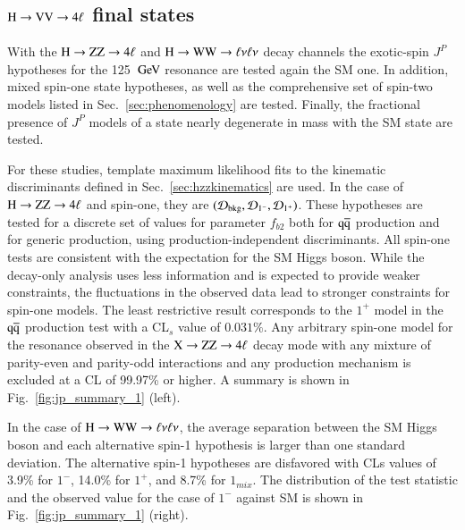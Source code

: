 \subsection{$\mathrm{H}\to\mathrm{V}\mathrm{V}\to4\ell$ final states}
\label{sec:exotic_h4l}

With the $\mathrm{H}\to\mathrm{Z}\mathrm{Z}\to4\ell$ and $\mathrm{H}\to\mathrm{W}\mathrm{W}\to\ell\nu\ell\nu$ decay channels the exotic-spin
$J^P$ hypotheses for the 125 $\,\mathrm{Ge\hspace{-.08em}V}$ resonance are tested again the SM
one. In addition, mixed spin-one state hypotheses, as well as the
comprehensive set of spin-two models listed in
Sec.~\ref{sec:phenomenology} are tested. Finally, the fractional
presence of $J^P$ models of a state nearly degenerate in mass with the
SM state are tested.

For these studies, template maximum likelihood fits to the kinematic
discriminants defined in Sec.~\ref{sec:hzzkinematics} are used.  In
the case of $\mathrm{H}\to\mathrm{Z}\mathrm{Z}\to4\ell$ and spin-one, they are
$({\cal D}_{\rm bkg},{\cal D}_{1^-},{\cal D}_{1^+})$. These hypotheses are tested for a
discrete set of values for parameter $f_{b2}$ both for $\mathrm{\mathrm{q}\mathrm{\overline{q}}}$
production and for generic production, using production-independent
discriminants. All spin-one tests are consistent with the expectation
for the SM Higgs boson.  While the decay-only analysis uses less
information and is expected to provide weaker constraints, the
fluctuations in the observed data lead to stronger constraints for
spin-one models.  The least restrictive result corresponds to the
$1^+$ model in the $\mathrm{\mathrm{q}\mathrm{\overline{q}}}$ production test with a CL$_s$ value of
$0.031\%$. Any arbitrary spin-one model for the resonance observed in
the $\mathrm{X}\to \mathrm{Z}\mathrm{Z}\to 4\ell$ decay mode with any mixture of parity-even
and parity-odd interactions and any production mechanism is excluded
at a CL of 99.97\% or higher. A summary is shown in
Fig.~\ref{fig:jp_summary_1} (left).

In the case of $\mathrm{H}\to\mathrm{W}\mathrm{W}\to\ell\nu\ell\nu$, the average separation between the SM Higgs
boson and each alternative spin-1 hypothesis is larger than one
standard deviation. The alternative spin-1 hypotheses are disfavored
with CLs values of 3.9\% for $1^-$, 14.0\% for $1^{+}$, and 8.7\% for
$1_{mix}$. The distribution of the test statistic and the observed
value for the case of $1^-$ against SM is shown in
Fig.~\ref{fig:jp_summary_1} (right).



